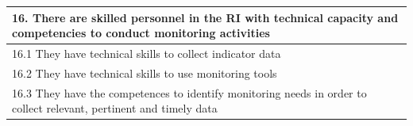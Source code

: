 \documentclass[
  10pt,
]{book}
\begin{document}
\begin{table}
\begin{tabular}[t]{l}
\hline
\multicolumn{1}{l}{\textbf{16. There are skilled personnel in the RI with technical capacity and competencies to conduct monitoring activities}}\\
\hline
\hspace{1em}16.1 They have technical skills to collect indicator data\\
\hline
\hspace{1em}16.2 They have technical skills to use monitoring tools\\
\hline
\hspace{1em}16.3 They have the competences to identify monitoring needs in order to collect relevant, pertinent and timely data\\
\hline
\end{tabular}
\end{table}
\end{document}
